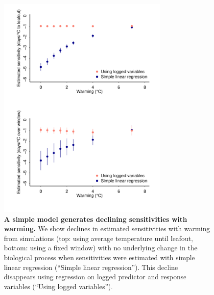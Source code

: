 \documentclass[11pt]{article}
\begin{document}
\clearpage
\begin{figure}[h!]
\centering
\noindent \includegraphics[width=0.75\textwidth]{..//analyses/figures/basicsims.pdf}
\caption{\textbf{A simple model generates declining sensitivities with warming.} We show declines in estimated sensitivities with warming from simulations (top: using average temperature until leafout, bottom: using a fixed window) with no underlying change in the biological process when sensitivities were estimated with simple linear regression (``Simple linear regression''). This decline disappears using regression on logged predictor and response variables (``Using logged variables'').}
\label{fig:basicsims} %
\end{figure}
\end{document}
